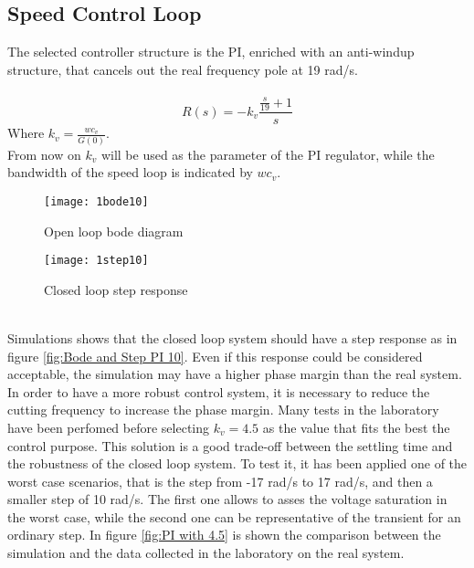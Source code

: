 \newpage
\subsection{Speed Control Loop}
The selected controller structure is the PI, enriched with an anti-windup structure, that cancels out the real frequency pole at 19 rad/s. \\
\\
\[
R(s)=-k_v
\frac{\frac{s}{19}+1}{s}
\]
\newline
Where $k_{v}=\frac{wc_{v}}{G(0)}$.
\\
 From now on $k_v$ will be used as the parameter of the PI regulator, while the bandwidth of the speed loop is indicated by $wc_v$.
\\
\begin{figure*}[h]
	\centering
	\begin{subfigure}{0.45\columnwidth}
		\texttt{[image: 1bode10]}
		\caption{Open loop bode diagram}
	\end{subfigure}
	\begin{subfigure}{0.45\columnwidth}
		\texttt{[image: 1step10]}
		\caption{Closed loop step response}
	\end{subfigure}
	\caption{Speed control loop with  $wc_{v} $=10 rad/s}
	\label{fig:Bode and Step PI 10}
\end{figure*}
\\
Simulations shows that the closed loop system should have a step response as in figure \ref{fig:Bode and Step PI 10}. 
Even if this response could be considered acceptable, the simulation may have a higher phase margin than the real system. In order to have a more robust control system, it is necessary to reduce the cutting frequency to increase the phase margin. 
\newline Many tests in the laboratory have been perfomed before selecting $k_v=4.5$ as the value that fits the best the control purpose. This solution is a good trade-off between the settling time and the robustness of the closed loop system.
To test it, it has been applied one of the worst case scenarios, that is the step from -17 rad/s to 17 rad/s, and then a smaller step of 10 rad/s. The first one allows to asses the voltage saturation in the worst case, while the second one can be representative of the transient for an ordinary step.
In figure \cref{fig:PI with 4.5} is shown the comparison between the simulation and the data collected in the laboratory on the real system.

\newpage

